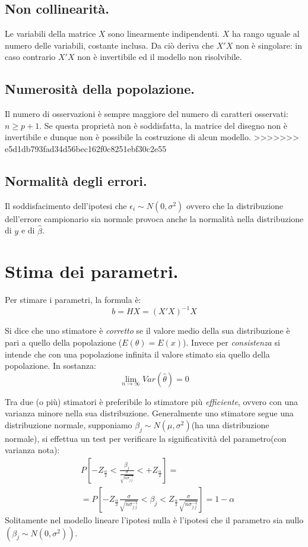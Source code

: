 \documentclass[11pt, twocolumn]{article}
\begin{document}
\subsection*{Non collinearità.}
Le variabili della matrice $X$ sono linearmente indipendenti. $X$ ha rango uguale al numero delle variabili, costante inclusa. Da ciò deriva che $X'X$ non è singolare: in caso contrario $X'X$ non è invertibile ed il modello non risolvibile.

\subsection*{Numerosità della popolazione.}
Il numero di osservazioni è sempre maggiore del numero di caratteri osservati: $n \geq p + 1$.
Se questa proprietà non è soddisfatta, la matrice del disegno non è invertibile e dunque non è possibile la costruzione di alcun modello.
>>>>>>> e5d1db793fad34d56bec162f0c8251ebf30c2e55

\subsection*{Normalità degli errori.}
Il soddisfacimento dell'ipotesi che $\epsilon_i \sim N(0,\sigma^2)$ ovvero che la distribuzione dell’errore campionario sia normale provoca anche la normalità nella distribuzione di $y$ e di $\hat{\beta}$.

\section{Stima dei parametri.}
Per stimare i parametri, la formula è:
\begin{equation*}
  b = HX = (X'X)^{-1}X
\end{equation*}

Si dice che uno stimatore è \textit{corretto} se il valore medio della sua distribuzione è pari a quello della popolazione ($E(\theta) = E(x)$).
Invece per \textit{consistenza} si intende che con una popolazione infinita il valore stimato sia quello della popolazione.
In sostanza:
$$\lim_{n\to\infty} Var(\hat{\theta}) = 0$$

Tra due (o più) stimatori è preferibile lo stimatore più \textit{efficiente}, ovvero con una varianza minore nella sua distribuzione.
Generalmente uno stimatore segue una distribuzione normale, supponiamo $\beta_j \sim N(\mu,\sigma^2)$(ha una distribuzione normale), si effettua un test per verificare la significatività del parametro(con varianza nota):
\begin{align*}
  &P[-Z_{\frac{\alpha}{2}} < \frac{\beta_j}{\frac{\sigma}{\sqrt{n\sigma^{-1}_{j.j}}}} < +Z_{\frac{\alpha}{2}}] = \\
  &= P[-Z_{\frac{\alpha}{2}} \frac{\sigma}{\sqrt{n\sigma^{-1}_{j.j}}} < \beta_j < Z_{\frac{\alpha}{2}} \frac{\sigma}{\sqrt{n\sigma^{-1}_{j.j}}}] = 1 - \alpha
\end{align*}
Solitamente nel modello lineare l'ipotesi nulla è l'ipotesi che il parametro sia nullo $(\beta_j \sim N(0,\sigma^2))$.
\end{document}
